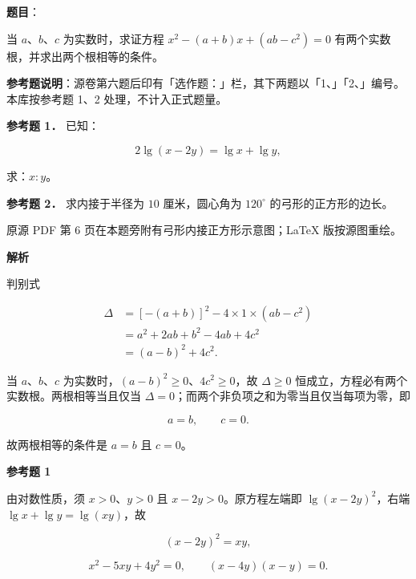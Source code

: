 \begin{answer}

\textbf{题目}：

当 $a$、$b$、$c$ 为实数时，求证方程 $x^2-(a+b)x+(ab-c^2)=0$ 有两个实数根，并求出两个根相等的条件。

\begin{gktip}
\textbf{参考题说明}：源卷第六题后印有「选作题：」栏，其下两题以「1、」「2、」编号。本库按参考题 1、2 处理，不计入正式题量。
\end{gktip}

\textbf{参考题 1．} 已知：

\nopagebreak[4]
\[
2\lg(x-2y)=\lg x+\lg y,
\]

求：$x:y$。

\textbf{参考题 2．} 求内接于半径为 $10$ 厘米，圆心角为 $120^\circ$ 的弓形的正方形的边长。

\begin{gktip}
原源 PDF 第 6 页在本题旁附有弓形内接正方形示意图；LaTeX 版按源图重绘。
\end{gktip}
\nopagebreak[4]
\begin{center}\end{center}
\nopagebreak[4]
\textbf{解析}

判别式

\nopagebreak[4]
\[
\begin{aligned}
\Delta&=[-(a+b)]^2-4\times1\times(ab-c^2)\\
&=a^2+2ab+b^2-4ab+4c^2\\
&=(a-b)^2+4c^2.
\end{aligned}
\]

当 $a$、$b$、$c$ 为实数时，$(a-b)^2\ge0$、$4c^2\ge0$，故 $\Delta\ge0$ 恒成立，方程必有两个实数根。两根相等当且仅当 $\Delta=0$；而两个非负项之和为零当且仅当每项为零，即

\nopagebreak[4]
\[
a=b,
\qquad
c=0.
\]

故两根相等的条件是 $a=b$ 且 $c=0$。

\textbf{参考题 1}

由对数性质，须 $x>0$、$y>0$ 且 $x-2y>0$。原方程左端即 $\lg(x-2y)^2$，右端 $\lg x+\lg y=\lg(xy)$，故

\nopagebreak[4]
\[
(x-2y)^2=xy,
\]

\nopagebreak[4]
\[
x^2-5xy+4y^2=0,
\qquad
(x-4y)(x-y)=0.
\]


\end{answer}
